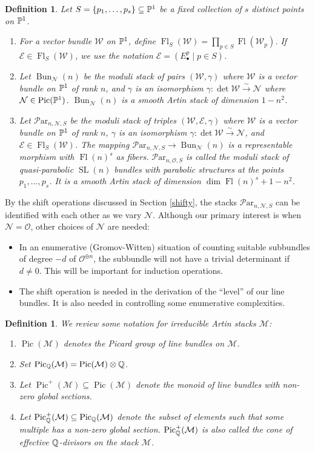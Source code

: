 \documentclass[11pt]{amsart}
\newcommand\op{\operatorname}
\newcommand\bull{{\bullet}}
\newcommand\Pic{\operatorname{Pic}}
\newcommand\me{\mathcal{E}}
\newcommand\Fl{\operatorname{Fl}}
\newcommand\tensor{\otimes}
\newcommand\mw{\mathcal{W}}
\newcommand\mn{\mathcal{N}}
\newcommand\Par{\mathcal{P}\text{ar} }
\newcommand{\leto}[1]{\stackrel{#1}{\to}}
\newtheorem{defi}[theorem]{Definition}
\numberwithin{theorem}{subsection}
\begin{document}
\begin{defi}
Let  $S=\{p_1,\dots,p_s\}\subseteq \Bbb{P}^1$ be a fixed collection of $s$ distinct points on $\Bbb{P}^1$.
\begin{enumerate}
\item For a vector bundle $\mathcal{W}$ on $\Bbb{P}^1$, define $\Fl_S(\mw)=\prod_{p\in S} \Fl(\mw_p)$. If $\me\in \Fl_S(\mw)$, we use the notation $\me=(E^p_{\bull}\mid p\in S)$.
\item  Let $\op{Bun}_{\mn}(n)$ be the moduli stack of  pairs   $(\mw,\gamma)$ where $\mw$ is a vector bundle on $\Bbb{P}^1$ of rank $n$,  and $\gamma$ is an isomorphism $\gamma:\det \mw\leto{\sim}\mn$ where $\mn\in \op{Pic}(\Bbb{P}^1)$. $\op{Bun}_{\mn}(n)$ is a smooth Artin stack of dimension $1-n^2$.
\item  Let $\Par_{n,\mn,S}$ be the moduli  stack of triples $(\mw,\me,\gamma)$ where $\mw$ is a vector bundle on $\Bbb{P}^1$ of rank $n$,   $\gamma$ is an isomorphism $\gamma:\det \mw\leto{\sim}\mn$, and $\me\in\Fl_S(\mw)$. The mapping  $\Par_{n,\mn,S}\to\op{Bun}_{\mn}(n)$ is a representable morphism
with $\op{Fl}(n)^s$ as fibers. $\Par_{n,\mathcal{O},S}$ is called the moduli  stack
of quasi-parabolic $\op{SL}(n)$ bundles with parabolic structures at the points $p_1,\dots,p_s$. It is a smooth Artin stack of dimension $\dim \Fl(n)^s + 1-n^2$.
\end{enumerate}
\end{defi}
By the shift operations discussed in Section \ref{shifty}, the stacks $\Par_{n,\mn,S}$ can be identified with each other as we vary $\mn$. Although our primary interest is when $\mathcal{N}=\mathcal{O}$, other choices of $\mathcal{N}$ are needed:
 \begin{itemize}
 \item[-]  In an enumerative (Gromov-Witten) situation of counting suitable subbundles of degree $-d$ of $\mathcal{O}^{\oplus n}$, the subbundle will not have a trivial determinant if $d\neq 0$. This will be important for induction operations.
 \item[-] The shift operation is needed in the derivation of the ``level'' of our line bundles. It is also needed in controlling some enumerative complexities.
 \end{itemize}
 \begin{defi}
We review some notation for irreducible Artin stacks $\mathcal{M}$:
\begin{enumerate}
\item $\Pic(\mathcal{M})$ denotes the Picard group of line bundles on $\mathcal{M}$.
\item Set $\Pic_{\Bbb{Q}}(\mathcal{M})=\Pic(\mathcal{M})\tensor\Bbb{Q}$.
\item Let $\Pic^+(\mathcal{M})\subseteq \Pic(\mathcal{M})$ denote the monoid of line bundles with non-zero global sections.
\item Let $\Pic^+_{\Bbb{Q}}(\mathcal{M})\subseteq \Pic_{\Bbb{Q}}(\mathcal{M})$ denote the subset of elements such that some multiple has a non-zero global section. $\Pic^+_{\Bbb{Q}}(\mathcal{M})$ is also called the cone of effective $\Bbb{Q}$-divisors on the stack $\mathcal{M}$.
\end{enumerate}
\end{defi}
\end{document}

